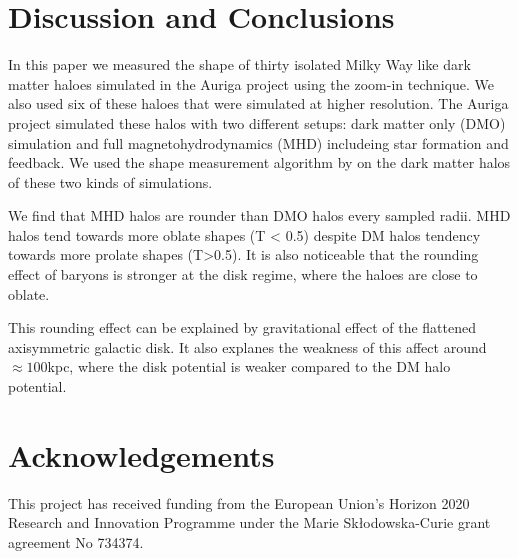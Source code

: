 \documentclass[a4paper,fleqn,usenatbib]{mnras}
\begin{document}
\section{Discussion and Conclusions}

In this paper we measured the shape of thirty isolated Milky Way like 
dark matter haloes simulated in the Auriga project using the zoom-in
technique. 
We also used six of these haloes that were simulated at higher
resolution. 
The Auriga project simulated these halos with two different setups:
dark matter only (DMO) simulation and full magnetohydrodynamics (MHD)
includeing star formation and feedback.
We used the shape measurement algorithm by \cite{Allgood06} on the
dark matter halos of these two kinds of simulations.


We find that MHD halos are rounder than DMO halos every sampled radii. 
MHD halos tend towards more oblate shapes (T < 0.5)
despite DM halos tendency towards more prolate shapes (T>0.5). 
It is also noticeable that the rounding effect of baryons is stronger
at the disk regime, where the haloes are close to oblate.

This rounding effect can be explained by gravitational effect of the
flattened axisymmetric galactic disk. 
It also explanes the weakness of this affect around $\approx 100$kpc,
where the disk potential is weaker compared to the DM halo potential. 

\section*{Acknowledgements}
This project has received funding from the European Union's Horizon
2020 Research and Innovation Programme under the Marie
Sk\l{}odowska-Curie grant agreement No 734374. 

 
 
\end{document}
